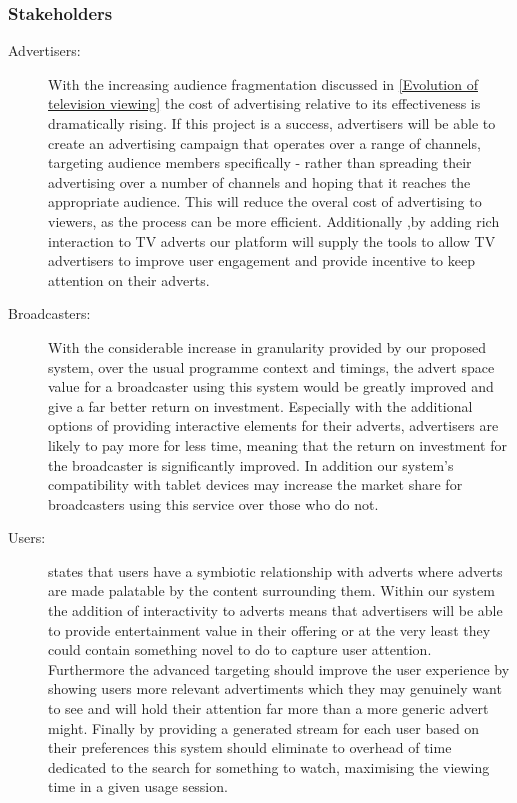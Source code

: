 \subsubsection{Stakeholders}
\begin{description}
\item[Advertisers:]{With the increasing audience fragmentation discussed in \ref{Evolution of television viewing} the cost of advertising relative to its effectiveness is dramatically rising. If this project is a success, advertisers will be able to create an advertising campaign that operates over a range of channels, targeting audience members specifically - rather than spreading their advertising over a number of channels and hoping that it reaches the appropriate audience. This will reduce the overal cost of advertising to viewers, as the process can be more efficient. Additionally ,by adding rich interaction to TV adverts our platform will supply the tools to allow TV advertisers to improve user engagement and provide incentive to keep attention on their adverts.}
\item[Broadcasters:]{With the considerable increase in granularity provided by our proposed system, over the usual programme context and timings, the advert space value for a broadcaster using this system would be greatly improved and give a far better return on investment. Especially with the additional options of providing interactive elements for their adverts, advertisers are likely to pay more for less time, meaning that the return on investment for the broadcaster is significantly improved. In addition our system's compatibility with tablet devices may increase the market share for broadcasters using this service over those who do not.}
\item[Users:]{\citet{broadcastEconomics} states that users have a symbiotic relationship with adverts where adverts are made palatable by the content surrounding them. Within our system the addition of interactivity to adverts means that advertisers will be able to provide entertainment value in their offering or at the very least they could contain something novel to do to capture user attention. Furthermore the advanced targeting should improve the user experience by showing users more relevant advertiments which they may genuinely want to see and will hold their attention far more than a more generic advert might. Finally by providing a generated stream for each user based on their preferences this system should eliminate to overhead of time dedicated to the search for something to watch, maximising the viewing time in a given usage session.}

\end{description}
